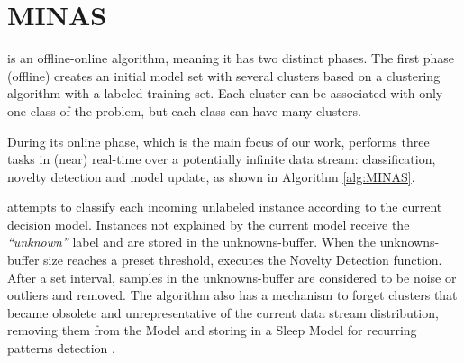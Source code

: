 
\section{MINAS}
\label{sec:minas}


\minas \cite{Faria2013Minas,Faria2016minas} is an offline-online \nd algorithm,
meaning it has two distinct phases. The first phase (offline) creates an initial
model set with several clusters based on a clustering algorithm with a labeled
training set.
Each cluster can be associated with only one class of the problem, but each
class can have many clusters.

During its online phase, which is the main focus of our work, \minas performs
three tasks in (near) real-time over a potentially infinite data stream:
classification, novelty detection and model update,
as shown in Algorithm \ref{alg:MINAS}.

\minas attempts to classify each incoming unlabeled instance according to the
current decision model. Instances not explained by the current model
receive the \textit{``unknown''} label and are stored in the unknowns-buffer.
When the unknowns-buffer size reaches a preset threshold, \minas executes the
Novelty Detection function.
After a set interval, samples in the unknowns-buffer are considered to be
noise or outliers and removed.
The algorithm also has a mechanism to forget clusters that became obsolete and
unrepresentative of the current data stream distribution, removing them from
the Model and storing in a Sleep Model for recurring patterns
detection \cite{Faria2016minas}.


